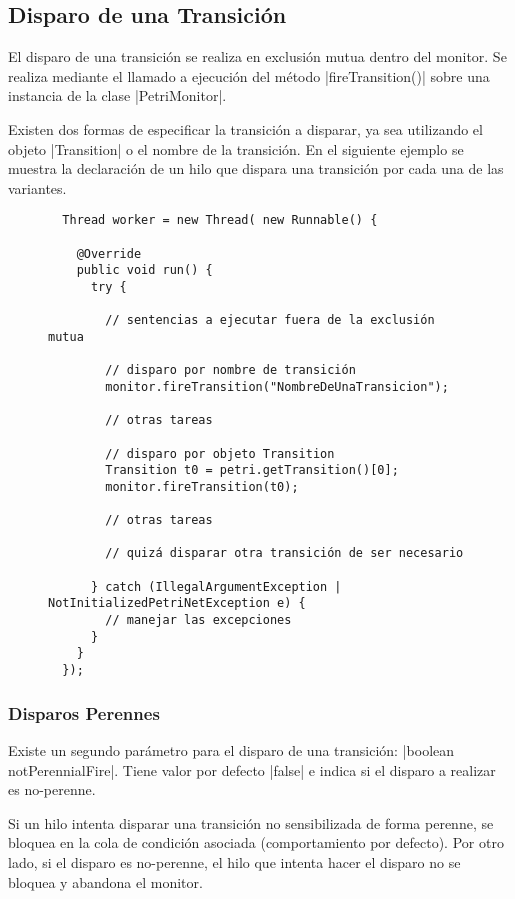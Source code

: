 \subsection{Disparo de una Transición}

El disparo de una transición se realiza en exclusión mutua dentro del monitor.
Se realiza mediante el llamado a ejecución del método
|fireTransition()| sobre una instancia de la clase
|PetriMonitor|.

Existen dos formas de especificar la transición a disparar, ya sea utilizando
el objeto |Transition| o el nombre de la transición.
En el siguiente ejemplo se muestra la declaración de un hilo que dispara una
transición por cada una de las variantes.

\begin{figure}[H]
\centering
\begin{verbatim}
  Thread worker = new Thread( new Runnable() {
  
    @Override
    public void run() {
      try {
      
        // sentencias a ejecutar fuera de la exclusión mutua

        // disparo por nombre de transición
        monitor.fireTransition("NombreDeUnaTransicion");

        // otras tareas

        // disparo por objeto Transition
        Transition t0 = petri.getTransition()[0];
        monitor.fireTransition(t0);
      
        // otras tareas
      
        // quizá disparar otra transición de ser necesario

      } catch (IllegalArgumentException | NotInitializedPetriNetException e) {
        // manejar las excepciones
      }
    }
  });
\end{verbatim}
\end{figure}

\subsubsection*{Disparos Perennes}
\label{disparos_perennes}
Existe un segundo parámetro para el disparo de una transición: 
|boolean notPerennialFire|. Tiene valor por defecto
|false| e indica si el disparo a realizar es no-perenne.

Si un hilo intenta disparar una transición no sensibilizada de forma perenne, se
bloquea en la cola de condición asociada (comportamiento por defecto). Por otro
lado, si el disparo es no-perenne, el hilo que intenta hacer el disparo no se
bloquea y abandona el monitor.

